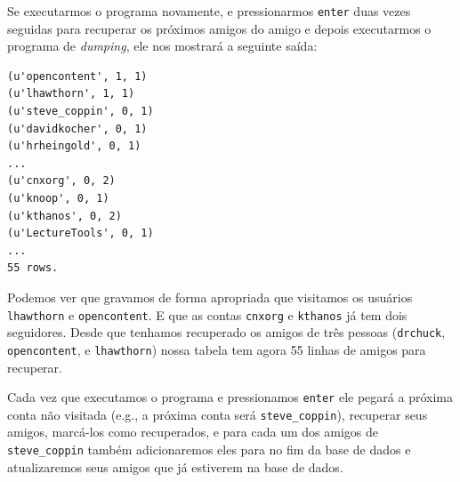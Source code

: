 
Se executarmos o programa novamente, e pressionarmos {\tt enter} duas vezes
seguidas para recuperar os próximos amigos do amigo e depois executarmos o
programa de {\it dumping}, ele nos mostrará a seguinte saída:

\beforeverb
\begin{verbatim}
(u'opencontent', 1, 1)
(u'lhawthorn', 1, 1)
(u'steve_coppin', 0, 1)
(u'davidkocher', 0, 1)
(u'hrheingold', 0, 1)
...
(u'cnxorg', 0, 2)
(u'knoop', 0, 1)
(u'kthanos', 0, 2)
(u'LectureTools', 0, 1)
...
55 rows.
\end{verbatim}
\afterverb
%

Podemos ver que gravamos de forma apropriada que visitamos os usuários
{\tt lhawthorn} e {\tt opencontent}. E que as contas {\tt cnxorg} e
{\tt kthanos} já tem dois seguidores. Desde que tenhamos recuperado os amigos
de três pessoas ({\tt drchuck}, {\tt opencontent}, e {\tt lhawthorn}) nossa
tabela tem agora 55 linhas de amigos para recuperar.


Cada vez que executamos o programa e pressionamos {\tt enter} ele pegará a
próxima conta não visitada (e.g., a próxima conta será \verb"steve_coppin"),
recuperar seus amigos, marcá-los como recuperados, e para cada um dos amigos
de \verb"steve_coppin" também adicionaremos eles para no fim da base de dados 
e atualizaremos seus amigos que já estiverem na base de dados.


